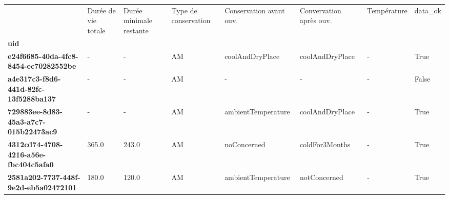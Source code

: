 \begin{tabularx}{\linewidth}{lXXXXXXX}
\toprule
{} &  Durée de vie totale &  Durée minimale restante & Type de conservation & Conservation avant ouv. & Convervation après ouv. & Température &  data\_ok \\
\textbf{uid                                 } &                      &                          &                      &                         &                         &             &          \\
\midrule
\textbf{e24f6685-40da-4fc8-8454-ec70282552be} &                    - &                        - &                   AM &         coolAndDryPlace &         coolAndDryPlace &           - &     True \\
\textbf{a4e317c3-f8d6-441d-82fc-13f5288ba137} &                    - &                        - &                   AM &                       - &                       - &           - &    False \\
\textbf{729883ee-8d83-45a3-a7c7-015b22473ac9} &                    - &                        - &                   AM &      ambientTemperature &         coolAndDryPlace &           - &     True \\
\textbf{4312cd74-4708-4216-a56e-fbc404c5afa0} &                365.0 &                    243.0 &                   AM &             noConcerned &          coldFor3Months &           - &     True \\
\textbf{2581a202-7737-448f-9e2d-eb5a02472101} &                180.0 &                    120.0 &                   AM &      ambientTemperature &            notConcerned &           - &     True \\
\bottomrule
\end{tabularx}
